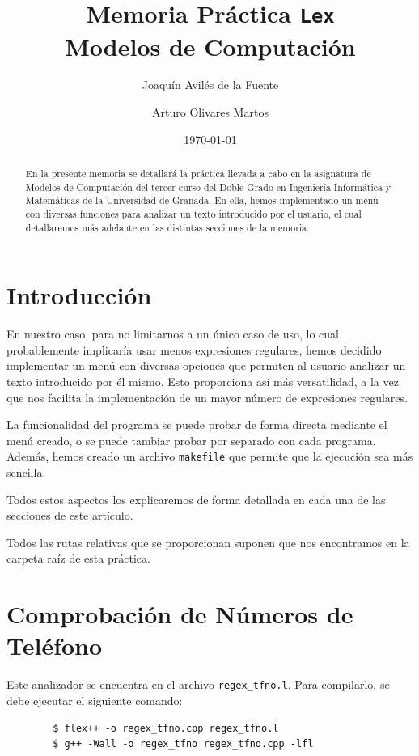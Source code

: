 \documentclass[12pt]{article}
\author{Joaquín Avilés de la Fuente \and Arturo Olivares Martos}
\date{\today}
\title{Memoria Práctica \texttt{Lex}\\Modelos de Computación}
\begin{document}
    

    \maketitle
    \tableofcontents

    \begin{abstract}
        En la presente memoria se detallará la práctica llevada a cabo en la asignatura de Modelos de Computación del tercer curso del Doble Grado en Ingeniería Informática y Matemáticas de la Universidad de Granada.
        En ella, hemos implementado un menú con diversas funciones para analizar un texto introducido por el usuario, el cual detallaremos más adelante en las distintas secciones de la memoria.
    \end{abstract}

    \newpage
    \section{Introducción}

    En nuestro caso, para no limitarnos a un único caso de uso, lo cual probablemente implicaría usar menos expresiones regulares, hemos decidido implementar un menú con diversas opciones que permiten al usuario analizar un texto introducido por él mismo. Esto proporciona así más versatilidad, a la vez que nos facilita la implementación de un mayor número de expresiones regulares.

    La funcionalidad del programa se puede probar de forma directa mediante el menú creado, o se puede tambiar probar por separado con cada programa. Además, hemos creado un archivo \verb|makefile| que permite que la ejecución sea más sencilla.

    Todos estos aspectos los explicaremos de forma detallada en cada una de las secciones de este artículo.

    \begin{observacion}
    Todos las rutas relativas que se proporcionan suponen que nos encontramos en la carpeta raíz de esta práctica.
    \end{observacion}

    \section{Comprobación de Números de Teléfono}

    Este analizador se encuentra en el archivo \verb|regex_tfno.l|. Para compilarlo, se debe ejecutar el siguiente comando:
    \begin{verbatim}
        $ flex++ -o regex_tfno.cpp regex_tfno.l
        $ g++ -Wall -o regex_tfno regex_tfno.cpp -lfl
    \end{verbatim}
\end{document}
